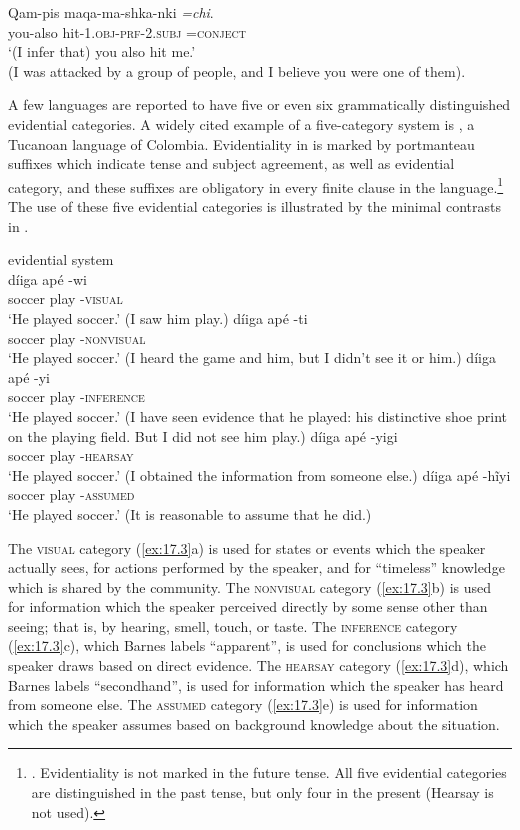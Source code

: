  \ex \gll Qam-pis  maqa-ma-shka-nki  \textit{=chi}.\\
you-also  hit-1\textsc{.obj}-\textsc{prf-2.subj}  \textsc{=conject}\\
\glt ‘(I infer that) you also hit me.’\\
(I was attacked by a group of people, and I believe you were one of them).
\z \z


A few languages are reported to have five or even six grammatically distinguished evidential categories. A widely cited example of a five-category system is , a  {Tucanoan} language of Colombia. Evidentiality in  is marked by portmanteau suffixes which indicate tense and subject agreement, as well as evidential category, and these suffixes are obligatory in every finite clause in the language.\footnote{\citet{Barnes1984}. Evidentiality is not marked in the future tense. All five evidential categories are distinguished in the past tense, but only four in the present (Hearsay is not used).} The use of these five evidential categories is illustrated by the minimal contrasts in .


\ea \label{ex:17.3}
{ evidential system} \citep{Barnes1984}\\
\ea  \gll  díiga  apé  -wi  \\
soccer  play  -\textsc{visual}\\
\glt ‘He played soccer.’ (I saw him play.)
\ex \gll díiga  apé  -ti\\
soccer  play  -\textsc{nonvisual}\\
\glt ‘He played soccer.’ (I heard the game and him, but I didn’t see it or him.)
\ex \gll  díiga  apé  -yi\\
soccer  play  -\textsc{inference}\\
\glt ‘He played soccer.’ (I have seen evidence that he played: his distinctive shoe print on the playing field. But I did not see him play.)
\ex \gll  díiga  apé  -yigi\\
soccer  play  -\textsc{hearsay}\\
\glt ‘He played soccer.’ (I obtained the information from someone else.)
\ex \gll  díiga  apé  -hĩyi\\
soccer  play  -\textsc{assumed}\\
\glt ‘He played soccer.’ (It is reasonable to assume that he did.)
\z \z

\largerpage %
The \textsc{visual} category (\ref{ex:17.3}a) is used for states or events which the speaker actually sees, for actions performed by the speaker, and for “timeless” knowledge which is shared by the community. The \textsc{nonvisual} category (\ref{ex:17.3}b) is used for information which the speaker perceived directly by some sense other than seeing; that is, by hearing, smell, touch, or taste. The \textsc{inference} category (\ref{ex:17.3}c), which Barnes labels “apparent”, is used for conclusions which the speaker draws based on direct evidence. The \textsc{hearsay} category (\ref{ex:17.3}d), which Barnes labels “secondhand”, is used for information which the speaker has heard from someone else. The \textsc{assumed} category (\ref{ex:17.3}e) is used for information which the speaker assumes based on background knowledge about the situation.


